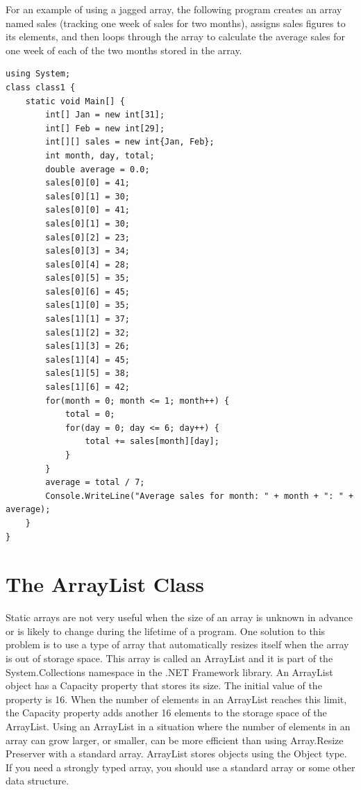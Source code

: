 \documentclass[12pt,a4paper,final,twoside,titlepage]{book}
\begin{document}
For an example of using a jagged array, the following program creates an array named sales (tracking one week of sales for two months), assigns sales figures to its elements, and then loops through the array to calculate the average sales for one week of each of the two months stored in the array.
\begin{lstlisting}
using System; 
class class1 {
	static void Main[] {
		int[] Jan = new int[31];
		int[] Feb = new int[29];
		int[][] sales = new int{Jan, Feb}; 
		int month, day, total;
		double average = 0.0;
		sales[0][0] = 41;
		sales[0][1] = 30;
		sales[0][0] = 41;
		sales[0][1] = 30;
		sales[0][2] = 23;
		sales[0][3] = 34;
		sales[0][4] = 28;
		sales[0][5] = 35;
		sales[0][6] = 45;
		sales[1][0] = 35;
		sales[1][1] = 37;
		sales[1][2] = 32;
		sales[1][3] = 26;
		sales[1][4] = 45;
		sales[1][5] = 38;
		sales[1][6] = 42;
		for(month = 0; month <= 1; month++) {
      		total = 0;
      		for(day = 0; day <= 6; day++) {
        		total += sales[month][day];
        	}
        }
      	average = total / 7;
   		Console.WriteLine("Average sales for month: " + month + ": " + average);
	}
}
\end{lstlisting}
\section{The ArrayList Class}
Static arrays are not very useful when the size of an array is unknown in advance or is likely to change during the lifetime of a program. One solution to this problem is to use a type of array that automatically resizes itself when the array is out of storage space. This array is called an ArrayList and it is part of the System.Collections namespace in the .NET Framework library.
An ArrayList object has a Capacity property that stores its size. The initial value of the property is 16. When the number of elements in an ArrayList reaches this limit, the Capacity property adds another 16 elements to the storage space of the ArrayList. Using an ArrayList in a situation where the number of elements in an array can grow larger, or smaller, can be more efficient than using Array.Resize Preserver with a standard array. ArrayList stores objects using the Object type. If you need a strongly typed array, you should use a standard array or some other data structure.
\end{document}
